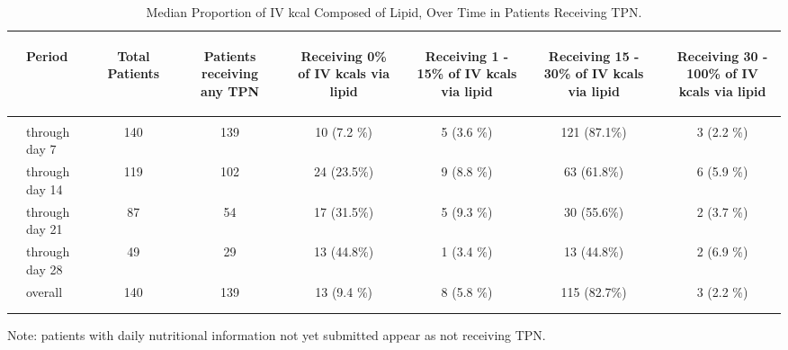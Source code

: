 \documentclass[dvips, 10pt]{article}
\begin{document}
\begin{table}[t]
\caption
{ Median Proportion of IV kcal Composed of Lipid, Over Time in Patients Receiving TPN. }
\begin{center}
\begin{tabular}{ @{}l@{}
@{}l@{}@{}p{1.5em}@{}@{}c@{}@{}p{1.5em}@{}@{}c@{}@{}p{1.5em}@{}@{}c@{}@{}p{1.5em}@{}@{}c@{}@{}p{1.5em}@{}@{}c@{}@{}p{1.5em}@{}@{}c@{}
}
\hline

& \parbox{6em}{\begin{center}Period\end{center}} && \parbox{6em}{\begin{center}Total Patients\end{center}} && \parbox{6em}{\begin{center}Patients receiving any TPN\end{center}} && \parbox{6em}{\begin{center}Receiving 0\% of IV kcals via lipid\end{center}} && \parbox{6em}{\begin{center}Receiving 1 - 15\% of IV kcals via lipid\end{center}} && \parbox{6em}{\begin{center}Receiving 15 - 30\% of IV kcals via lipid\end{center}} && \parbox{6em}{\begin{center}Receiving 30 - 100\% of IV kcals via lipid\end{center}} \\

\hline

\\
& through day 7 && 140 && 139 && 10 (7.2 \%) && 5 (3.6 \%) && 121 (87.1\%) && 3 (2.2 \%) \\
& through day 14 && 119 && 102 && 24 (23.5\%) && 9 (8.8 \%) && 63 (61.8\%) && 6 (5.9 \%) \\
& through day 21 && 87 && 54 && 17 (31.5\%) && 5 (9.3 \%) && 30 (55.6\%) && 2 (3.7 \%) \\
& through day 28 && 49 && 29 && 13 (44.8\%) && 1 (3.4 \%) && 13 (44.8\%) && 2 (6.9 \%) \\
& overall && 140 && 139 && 13 (9.4 \%) && 8 (5.8 \%) && 115 (82.7\%) && 3 (2.2 \%) \\
\\
\hline \\

\end{tabular}


\parbox{ 5in }{  Note: patients with daily nutritional information not yet submitted appear as not receiving TPN. } \\
 \vspace{1em}\end{center}
 \end{table}
\end{document}
